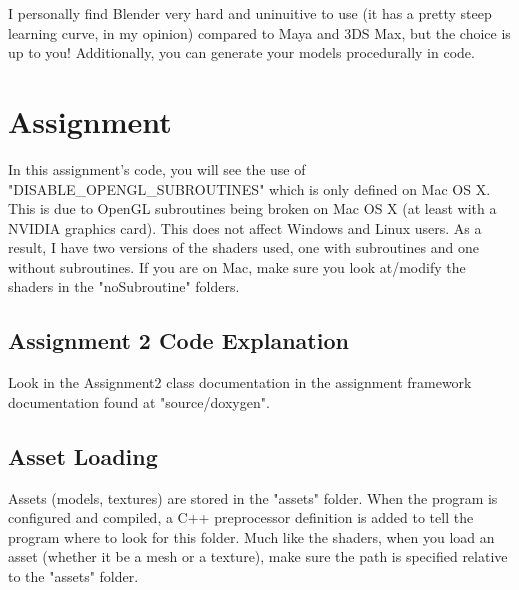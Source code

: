 \documentclass{article}
\begin{document}
I personally find Blender very hard and uninuitive to use (it has a pretty steep learning curve, in my opinion) compared to Maya and 3DS Max, but the choice is up to you! Additionally, you can generate your models procedurally in code.

\section*{Assignment}

In this assignment's code, you will see the use of "DISABLE\_OPENGL\_SUBROUTINES" which is only defined on Mac OS X. This is due to OpenGL subroutines being broken on Mac OS X (at least with a NVIDIA graphics card). This does not affect Windows and Linux users. As a result, I have two versions of the shaders used, one with subroutines and one without subroutines. If you are on Mac, make sure you look at/modify the shaders in the "noSubroutine" folders.

\subsection*{Assignment 2 Code Explanation}

Look in the Assignment2 class documentation in the assignment framework documentation found at "source/doxygen".

\subsection*{Asset Loading}

Assets (models, textures) are stored in the "assets" folder. When the program is configured and compiled, a C++ preprocessor definition is added to tell the program where to look for this folder. Much like the shaders, when you load an asset (whether it be a mesh or a texture), make sure the path is specified relative to the "assets" folder.
\end{document}
